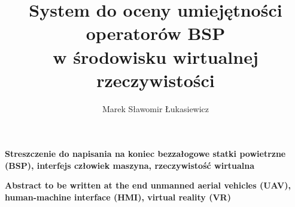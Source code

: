\documentclass[
    a4paper,
    left=25mm,         %
    right=25mm,        %
    top=25mm,          %
    bottom=25mm,         %
    bindingoffset=5mm,  %
    nohyphenation=false %
]{src/wut-thesis}
\newenvironment{todo} {\color{magenta} \bfseries} {} %
\begin{document}
\MasterThesis %
{}
\title{
    System do oceny umiejętności operatorów BSP \\
    w środowisku wirtualnej rzeczywistości
}
\author{Marek Sławomir Łukasiewicz}
\date{\the\year}
\maketitle

\cleardoublepage %
\streszczenie
\begin{todo}
    Streszczenie do napisania na koniec
\end{todo}
\slowakluczowe bezzałogowe statki powietrzne (BSP), interfejs człowiek maszyna, rzeczywistość wirtualna

\newpage
\abstract
\begin{todo}
    Abstract to be written at the end
\end{todo}
\keywords unmanned aerial vehicles (UAV), human-machine interface (HMI), virtual reality (VR)

\cleardoublepage  %
\pagestyle{plain}
\makeauthorship

\cleardoublepage %
\tableofcontents

\cleardoublepage %
\pagestyle{headings}








\end{document}
